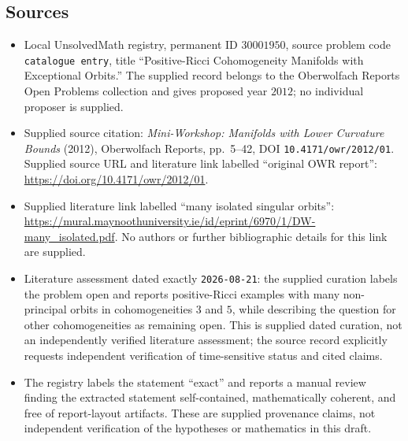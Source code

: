 \documentclass[11pt]{article}
\begin{document}
\subsection{Sources}
\begin{itemize}
\item Local UnsolvedMath registry, permanent ID \(30001950\), source problem code \texttt{catalogue entry}, title ``Positive-Ricci Cohomogeneity Manifolds with Exceptional Orbits.'' The supplied record belongs to the Oberwolfach Reports Open Problems collection and gives proposed year \(2012\); no individual proposer is supplied.
\item Supplied source citation: \emph{Mini-Workshop: Manifolds with Lower Curvature Bounds} (2012), Oberwolfach Reports, pp.~5--42, DOI \texttt{10.4171/owr/2012/01}. Supplied source URL and literature link labelled ``original OWR report'': \url{https://doi.org/10.4171/owr/2012/01}.
\item Supplied literature link labelled ``many isolated singular orbits'': \url{https://mural.maynoothuniversity.ie/id/eprint/6970/1/DW-many_isolated.pdf}. No authors or further bibliographic details for this link are supplied.
\item Literature assessment dated exactly \texttt{2026-08-21}: the supplied curation labels the problem open and reports positive-Ricci examples with many non-principal orbits in cohomogeneities \(3\) and \(5\), while describing the question for other cohomogeneities as remaining open. This is supplied dated curation, not an independently verified literature assessment; the source record explicitly requests independent verification of time-sensitive status and cited claims.
\item The registry labels the statement ``exact'' and reports a manual review finding the extracted statement self-contained, mathematically coherent, and free of report-layout artifacts. These are supplied provenance claims, not independent verification of the hypotheses or mathematics in this draft.
\end{itemize}
\end{document}
